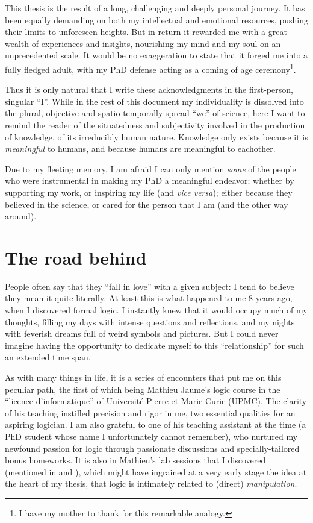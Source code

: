 
This thesis is the result of a long, challenging and deeply personal journey. It has been equally demanding on both my intellectual and emotional resources, pushing their limits to unforeseen heights. But in return it rewarded me with a great wealth of experiences and insights, nourishing my mind and my soul on an unprecedented scale. It would be no exaggeration to state that it forged me into a fully fledged adult, with my PhD defense acting as a coming of age ceremony\footnote{I have my mother to thank for this remarkable analogy.}.

Thus it is only natural that I write these acknowledgments in the first-person, singular ``I''. While in the rest of this document my individuality is dissolved into the plural, objective and spatio-temporally spread ``we'' of science, here I want to remind the reader of the situatedness and subjectivity involved in the production of knowledge, of its irreducibly human nature. Knowledge only exists because it is \emph{meaningful} to humans, and because humans are meaningful to eachother.

Due to my fleeting memory, I am afraid I can only mention \emph{some} of the people who were instrumental in making my PhD a meaningful endeavor; whether by supporting my work, or inspiring my life (and \textit{vice versa}); either because they believed in the science, or cared for the person that I am (and the other way around).

\section*{The road behind}

People often say that they ``fall in love'' with a given subject: I tend to believe they mean it quite literally. At least this is what happened to me 8 years ago, when I discovered formal logic. I instantly knew that it would occupy much of my thoughts, filling my days with intense questions and reflections, and my nights with feverish dreams full of weird symbols and pictures. But I could never imagine having the opportunity to dedicate myself to this ``relationship'' for such an extended time span.

As with many things in life, it is a series of encounters that put me on this peculiar path, the first of which being Mathieu Jaume's logic course in the ``licence d'informatique'' of Université Pierre et Marie Curie (UPMC). The clarity of his teaching instilled precision and rigor in me, two essential qualities for an aspiring logician. I am also grateful to one of his teaching assistant at the time (a PhD student whose name I unfortunately cannot remember), who nurtured my newfound passion for logic through passionate discussions and specially-tailored bonus homeworks. It is also in Mathieu's lab sessions that I discovered  (mentioned in  and ), which might have ingrained at a very early stage the idea at the heart of my thesis, that logic is intimately related to (direct) \emph{manipulation}.

